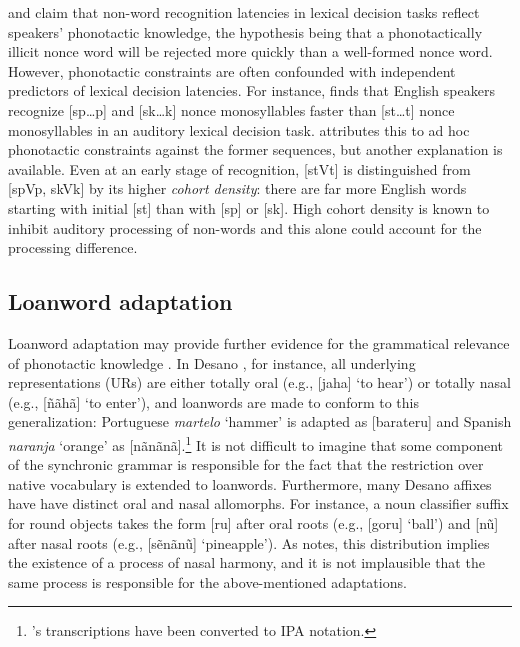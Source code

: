 \citet{Berent2001b} and \citet{Coetzee2008b} claim that non-word recognition latencies in lexical decision tasks reflect speakers' phonotactic knowledge, the hypothesis being that a phonotactically illicit nonce word will be rejected more quickly than a well-formed nonce word.
However, phonotactic constraints are often confounded with independent predictors of lexical decision latencies.
For instance, \citet{Coetzee2008b} finds that English speakers recognize [sp\ldots{}p] and [sk\ldots{}k] nonce monosyllables faster than [st\ldots{}t] nonce monosyllables in an auditory lexical decision task.
\citeauthor{Coetzee2008b} attributes this to ad hoc phonotactic constraints against the former sequences, but another explanation is available.
Even at an early stage of recognition, [stVt] is distinguished from [spVp, skVk] by its higher \emph{cohort density}: there are far more English words starting with initial [st] than with [sp] or [sk].
High cohort density is known to inhibit auditory processing of non-words \citep[e.g.,][]{Marslen-Wilson1978} and this alone could account for the processing difference.

\subsection{Loanword adaptation}

Loanword adaptation may provide further evidence for the grammatical relevance of phonotactic knowledge \citep[e.g.,][]{Fischer-Jorgensen1952}.
In Desano \citep{Kaye1971,Kaye1974}, for instance, all underlying representations (URs) are either totally oral (e.g., [jaha] `to hear') or totally nasal (e.g., [ñãhã] `to enter'), and loanwords are made to conform to this generalization: Portuguese \emph{martelo} `hammer' is adapted as [barateru] and Spanish \emph{naranja} `orange' as [nãnãnã].\footnote{
    \citeauthor{Kaye1971}'s transcriptions have been converted to IPA notation.}
It is not difficult to imagine that some component of the synchronic grammar is responsible for the fact that the restriction over native vocabulary is extended to loanwords.
Furthermore, many Desano affixes have have distinct oral and nasal allomorphs. 
For instance, a noun classifier suffix for round objects takes the form [ru] after oral roots (e.g., [goru] `ball') and [nũ] after nasal roots (e.g., [sẽnãnũ] `pineapple').
As \citet[38]{Kaye1971} notes, this distribution implies the existence of a process of nasal harmony, and it is not implausible that the same process is responsible for the above-mentioned adaptations.

